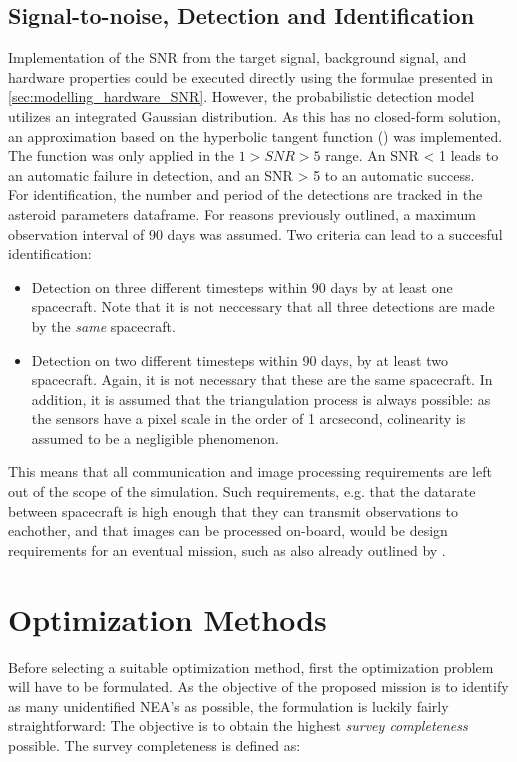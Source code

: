 \subsection{Signal-to-noise, Detection and Identification}
Implementation of the SNR from the target signal, background signal, and hardware properties could be executed directly using the formulae presented in \autoref{sec:modelling_hardware_SNR}. However, the probabilistic detection model utilizes an integrated Gaussian distribution. As this has no closed-form solution, an approximation based on the hyperbolic tangent function (\cite{GaussianTanh}) was implemented. The function was only applied in the $1 > SNR > 5$ range. An SNR < 1 leads to an automatic failure in detection, and an SNR > 5 to an automatic success. \\

For identification, the number and period of the detections are tracked in the asteroid parameters dataframe. For reasons previously outlined, a maximum observation interval of 90 days was assumed. Two criteria can lead to a succesful identification:
\begin{itemize}
 \item Detection on three different timesteps within 90 days by at least one spacecraft. Note that it is not neccessary that all three detections are made by the \textit{same} spacecraft.
 \item Detection on two different timesteps within 90 days, by at least two spacecraft. Again, it is not necessary that these are the same spacecraft. In addition, it is assumed that the triangulation process is always possible: as the sensors have a pixel scale in the order of 1 arcsecond, colinearity is assumed to be a negligible phenomenon.
\end{itemize}

This means that all communication and image processing requirements are left out of the scope of the simulation. Such requirements, e.g. that the datarate between spacecraft is high enough that they can transmit observations to eachother, and that images can be processed on-board, would be design requirements for an eventual mission, such as also already outlined by \cite{2017NEOSDT}.

\section{Optimization Methods}
\label{sec:methodologyoptimization}
Before selecting a suitable optimization method, first the optimization problem will have to be formulated. As the objective of the proposed mission is to identify as many unidentified NEA's as possible, the formulation is luckily fairly straightforward: The objective is to obtain the highest \textit{survey completeness} possible. The survey completeness is defined as:

